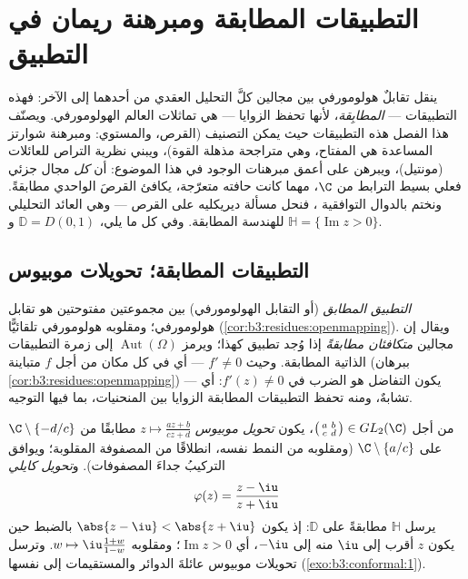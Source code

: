 \chapter{التطبيقات المطابقة ومبرهنة ريمان في التطبيق}
\label{ch:b3:conformal}

ينقل تقابلٌ هولومورفي بين مجالين كلَّ التحليل العقدي من أحدهما
إلى الآخر: فهذه التطبيقات --- \emph{المطابِقة}، لأنها تحفظ
الزوايا --- هي تماثلات العالم الهولومورفي. ويصنّف هذا الفصل هذه
التطبيقات حيث يمكن التصنيف (القرص، والمستوي: ومبرهنة شوارتز
المساعدة هي المفتاح، وهي متراجحة مذهلة القوة)، ويبني نظرية
التراص للعائلات  (مونتيل)، ويبرهن على أعمق مبرهنات
الوجود في هذا الموضوع: أن \emph{كل} مجال جزئي فعلي بسيط الترابط
من $\C$، مهما كانت حافته متعرّجة، يكافئ القرصَ الواحدي مطابقةً.
ونختم بالدوال التوافقية ، فنحل مسألة ديريكليه على
القرص --- وهي العائد التحليلي للهندسة المطابقة. وفي كل ما يلي،
$\mathbb D = D(0,1)$ و $\mathbb H = \{\operatorname{Im}z >
0\}$.

\section{التطبيقات المطابقة؛ تحويلات موبيوس}

\begin{definition}\label{def:b3:conformal:conformal}
\emph{التطبيق المطابق} (أو التقابل
الهولومورفي) بين مجموعتين مفتوحتين هو تقابل هولومورفي؛ ومقلوبه
هولومورفي تلقائيًّا (\cref{cor:b3:residues:openmapping}). ويقال إن مجالين \emph{متكافئان
مطابقةً} إذا وُجد تطبيق كهذا؛ ويرمز $\operatorname{Aut}(\Omega)$ إلى زمرة التطبيقات
الذاتية المطابقة. وحيث $f' \neq 0$ --- أي في كل مكان من أجل $f$
متباينة (ببرهان \cref{cor:b3:residues:openmapping}) --- يكون التفاضل هو الضرب في
$f'(z) \neq 0$: أي تشابهٌ، ومنه تحفظ التطبيقات المطابقة الزوايا
بين المنحنيات، بما فيها التوجيه.
\end{definition}

\begin{example}
\label{ex:b3:conformal:mobius}
من أجل $\bigl(\begin{smallmatrix}a & b\\ c &
d\end{smallmatrix}\bigr) \in GL_2(\C)$، يكون \emph{تحويل موبيوس}
$z \mapsto
\frac{az + b}{cz + d}$ مطابقًا من $\C\setminus\{-d/c\}$ على $\C\setminus\{a/c\}$ (ومقلوبه من النمط نفسه،
انطلاقًا من المصفوفة المقلوبة؛ ويوافق التركيبُ جداءَ
المصفوفات). و\emph{تحويل كايلي}
\[
\varphi(z) = \frac{z - \iu}{z + \iu}
\]
يرسل $\mathbb H$ مطابقةً على $\mathbb D$: إذ يكون $\abs{z
- \iu} < \abs{z + \iu}$ بالضبط
حين يكون $z$ أقرب إلى $\iu$ منه إلى $-\iu$، أي $\operatorname{Im}z > 0$؛ ومقلوبه
$w \mapsto \iu\frac{1 + w}{1 - w}$. وترسل تحويلات موبيوس عائلةَ الدوائر والمستقيمات إلى
نفسها (\cref{exo:b3:conformal:1}).
\end{example}

